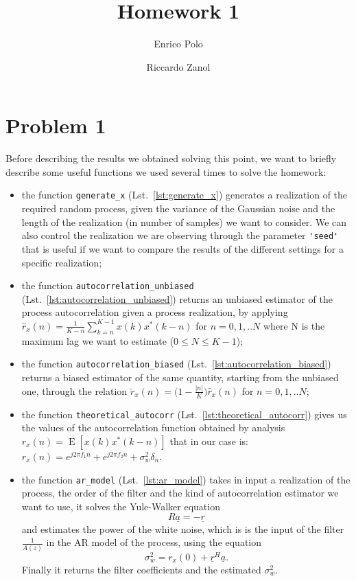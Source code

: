 \documentclass{article}
\author{Enrico Polo \and Riccardo Zanol}
\title{Homework 1}
\newcommand{\inlinecode}[1]{\lstinline[basicstyle=\ttfamily,
    keywordstyle={},
    stringstyle={},
    commentstyle={\itshape}]{#1}}
\renewcommand{\vec}[1]{\underline{#1}}
\newcommand{\E}[1]{\operatorname{E}\left[#1\right]}
\begin{document}
\maketitle
\section*{Problem 1}
Before describing the results we obtained solving this point, we want to briefly describe some useful functions we used several times to solve the homework:
\begin{itemize}
 \item the function \inlinecode{generate_x} (Lst.~\ref{lst:generate_x}) generates a realization of the required random process, given the variance of the Gaussian noise and the length of the realization (in number of samples) we want to consider. We can also control the realization we are observing through the parameter \inlinecode{'seed'} that is useful if we want to compare the results of the different settings for a specific realization; 
 \item the function \inlinecode{autocorrelation_unbiased} (Lst.~\ref{lst:autocorrelation_unbiased}) returns an unbiased estimator of the process autocorrelation given a process realization, by applying $\hat{r}_x(n) = \frac{1}{K-n} \sum_{k=n}^{K-1} {x(k)x^*(k-n)}$ for $n = 0,1,..N$ where N is the maximum lag we want to estimate ($0\leq N \leq K-1$);
 \item the function \inlinecode{autocorrelation_biased} (Lst.~\ref{lst:autocorrelation_biased}) returns a biased estimator of the same quantity, starting from the unbiased one, through the relation $\breve{r}_x(n) = \bigl( 1 - \frac{|n|}{K}\bigr) \hat{r}_x(n)$ for $n = 0,1,..N$;
 \item  the function \inlinecode{theoretical_autocorr} (Lst.~\ref{lst:theoretical_autocorr}) gives us the values of the autocorrelation function obtained by analysis $r_x (n) =  \E{x(k)x^*(k-n)}$ that in our case is: $r_x (n) = e^{j2 \pi f_1n} + e^{j2\pi f_2n} + \sigma_w^2 \delta_n$.
 \item the function \inlinecode{ar_model} (Lst.~\ref{lst:ar_model})
   takes in input a realization of the process, the order of the
   filter and the kind of autocorrelation estimator we want to use, it
   solves the Yule-Walker equation
   \[ R\vec{a} = -\vec{r} \]
   and estimates the power of the white noise, which is is the input of
   the filter $\frac{1}{A(z)}$ in the AR model of the process, using the equation
   \[ \sigma^2_w = r_x(0) + \vec{r}^H\vec{a} . \]
   Finally it returns the filter coefficients and the estimated $\sigma^2_w$.
\end{itemize}
\end{document}

